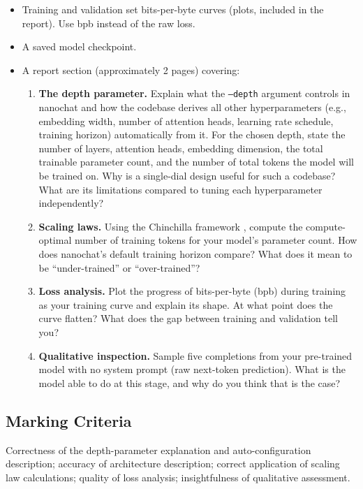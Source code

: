 \begin{itemize}
    \item Training and validation set bits-per-byte curves (plots, included in the report). Use bpb instead of the raw loss.
    \item A saved model checkpoint.
    \item A report section (approximately 2 pages) covering:
          \begin{enumerate}
              \item \textbf{The depth parameter.}  Explain what the \texttt{--depth} argument controls in nanochat and how the codebase derives all other hyperparameters (e.g., embedding width, number of attention heads, learning rate schedule, training horizon) automatically from it. For the chosen depth, state the number of layers, attention heads, embedding dimension, the total trainable parameter count, and the number of total tokens the model will be trained on. Why is a single-dial design useful for such a codebase?  What are its limitations compared to tuning each hyperparameter independently?
              \item \textbf{Scaling laws.}  Using the Chinchilla framework \citep{10.5555/3600270.3602446}, compute the compute-optimal number of training tokens for your model's parameter count. How does nanochat's default training horizon compare? What does it mean to be ``under-trained'' or ``over-trained''?
              \item \textbf{Loss analysis.}  Plot the progress of bits-per-byte (bpb) during training as your training curve and explain its shape. At what point does the curve flatten? What does the gap between training and validation tell you?
              \item \textbf{Qualitative inspection.}  Sample five completions from your pre-trained model with no system prompt (raw next-token prediction). What is the model able to do at this stage, and why do you think that is the case?
          \end{enumerate}
\end{itemize}

\subsection{Marking Criteria}

Correctness of the depth-parameter explanation and auto-configuration description; accuracy of architecture description; correct application of scaling law calculations; quality of loss analysis; insightfulness of qualitative assessment.

